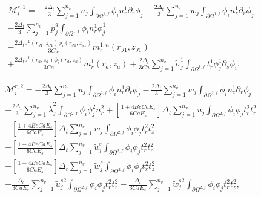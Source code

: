 \documentclass{article}
\begin{document}
\begin{equation}
\begin{array}{l} \mathcal{M}_i^{r,1} = -\frac{2\Delta_t}{3} \sum_{j=1}^{n_v} u_j \int_{\partial \Omega^{1,f}} \phi_i n_r^1 \partial_r \phi_j - \frac{2\Delta_t}{3} \sum_{j=1}^{n_v} w_j \int_{\partial \Omega^{1,f}} \phi_i n_z^1 \partial_r \phi_j \\ - \frac{2\Delta_t}{3} \sum_{j=1}^{n_v} \tilde{p}_j^g \int_{\partial \Omega^{1,f}} \phi_i n_r^1 \phi_j^1 \\ - \frac{2\Delta_t \sigma^1(r_{J1},z_{J1})\phi_i(r_{J1},z_{J1})}{3Ca} m_r^{1,n}(r_{J1},z_{J1}) \\ + \frac{2\Delta_t \sigma^1(r_a,z_a)\phi_i(r_a,z_a)}{3Ca} m_r^{1}(r_a,z_a) + \frac{2\Delta_t}{3Ca} \sum_{j=1}^{n_v} \tilde{\sigma}_j^1 \int_{\partial \Omega^{1,f}} t_r^1 \phi_j^1 \partial_s \phi_i, \end{array} \tag{4.88}
\end{equation}

\begin{equation}
\begin{array}{l} \mathcal{M}_i^{r,2} = -\frac{2\Delta_t}{3} \sum_{j=1}^{n_v} u_j \int_{\partial \Omega^{2,f}} \phi_i n_r^1 \partial_r \phi_j - \frac{2\Delta_t}{3} \sum_{j=1}^{n_v} w_j \int_{\partial \Omega^{2,f}} \phi_i n_z^1 \partial_r \phi_j \\ + \frac{2\Delta_t}{3} \sum_{j=1}^{n_v} \tilde{\lambda}_j^2 \int_{\partial \Omega^{2,f}} \phi_i \phi_j^2 n_r^2 + \left[ \frac{1 + 4Be Ca E_s}{6Ca E_s} \right] \Delta_t \sum_{j=1}^{n_v} u_j \int_{\partial \Omega^{2,f}} \phi_i \phi_j t_r^2 t_r^2 \\ + \left[ \frac{1 + 4Be Ca E_s}{6Ca E_s} \right] \Delta_t \sum_{j=1}^{n_v} w_j \int_{\partial \Omega^{2,f}} \phi_i \phi_j t_r^2 t_z^2 \\ + \left[ \frac{1 - 4Be Ca E_s}{6Ca E_s} \right] \Delta_t \sum_{j=1}^{n_v} \tilde{u}_j^s \int_{\partial \Omega^{2,f}} \phi_i \phi_j t_r^2 t_r^2 \\ + \left[ \frac{1 - 4Be Ca E_s}{6Ca E_s} \right] \Delta_t \sum_{j=1}^{n_v} \tilde{w}_j^s \int_{\partial \Omega^{2,f}} \phi_i \phi_j t_r^2 t_z^2 \\ - \frac{\Delta_t}{3Ca E_s} \sum_{j=1}^{n_v} \tilde{u}_j^{s2} \int_{\partial \Omega^{2,f}} \phi_i \phi_j t_r^2 t_r^2 - \frac{\Delta_t}{3Ca E_s} \sum_{j=1}^{n_v} \tilde{w}_j^{s2} \int_{\partial \Omega^{2,f}} \phi_i \phi_j t_r^2 t_z^2, \end{array} \tag{4.89}
\end{equation}
\end{document}

